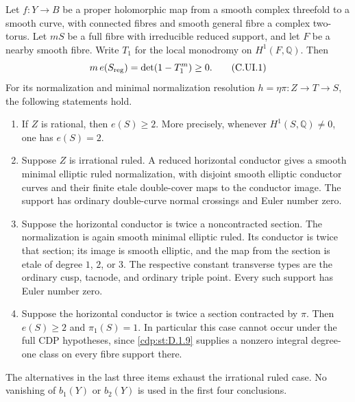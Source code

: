
\begin{proposition}\label{cdp:st:C.2.UN.7}
Let $f:Y\to B$ be a proper holomorphic map from a smooth
complex threefold to a smooth curve, with connected fibres
and smooth general fibre a complex two-torus. Let $mS$ be a full
fibre with irreducible reduced support, and let $F$ be a nearby
smooth fibre. Write $T_1$ for the local monodromy on
$H^1(F,\mathbb Q)$. Then
\[
 m\,e(S_{\rm reg})=\det(1-T_1^m)\ge0.
 \tag{C.UI.1}\label{cdp:eq:C.UI.1}
\]
For its normalization and minimal normalization resolution
$h=\eta\pi:Z\to T\to S$, the following statements hold.

\begin{enumerate}
\item If $Z$ is rational, then $e(S)\ge2$. More precisely,
      whenever $H^1(S,\mathbb Q)\ne0$, one has $e(S)=2$.
\item Suppose $Z$ is irrational ruled. A reduced horizontal
      conductor gives a smooth minimal elliptic ruled
      normalization, with disjoint smooth elliptic conductor
      curves and their finite etale double-cover maps to the
      conductor image. The support has ordinary double-curve
      normal crossings and Euler number zero.
\item Suppose the horizontal conductor is twice a noncontracted
      section. The normalization is again smooth minimal
      elliptic ruled. Its conductor is twice that section;
      its image is smooth elliptic, and the map from the
      section is etale of degree $1$, $2$, or $3$.
      The respective constant transverse types are the
      ordinary cusp, tacnode, and ordinary triple point.
      Every such support has Euler number zero.
\item Suppose the horizontal conductor is twice a section
      contracted by $\pi$. Then $e(S)\ge2$ and
      $\pi_1(S)=1$. In particular this case cannot occur
      under the full CDP hypotheses, since \ref{cdp:st:D.1.9} supplies
      a nonzero integral degree-one class on every fibre
      support there.
\end{enumerate}
The alternatives in the last three items exhaust the
irrational ruled case. No vanishing of $b_1(Y)$ or $b_2(Y)$
is used in the first four conclusions.
\end{proposition}
